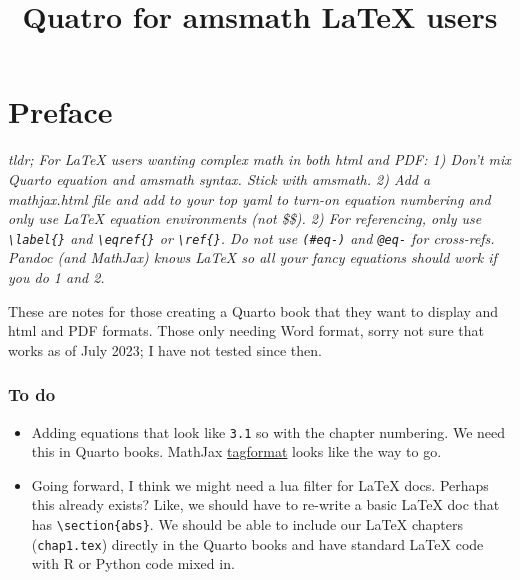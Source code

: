 \documentclass[
  letterpaper,
  DIV=11,
  numbers=noendperiod]{scrreprt}
\title{Quatro for amsmath LaTeX users}
\author{}
\date{}
\providecommand{\tightlist}{%
  \setlength{\itemsep}{0pt}\setlength{\parskip}{0pt}}\usepackage{longtable,booktabs,array}
\renewcommand*\contentsname{Table of contents}
\newcommand\contentsname{Table of contents}
\begin{document}
\maketitle

\renewcommand*\contentsname{Table of contents}
{
\hypersetup{linkcolor=}
\setcounter{tocdepth}{2}
\tableofcontents
}


\chapter*{Preface}\label{preface}


\emph{tldr; For LaTeX users wanting complex math in both html and PDF:
1) Don't mix Quarto equation and amsmath syntax. Stick with amsmath. 2)
Add a mathjax.html file and add to your top yaml to turn-on equation
numbering and only use LaTeX equation environments (not \$\$). 2) For
referencing, only use \texttt{\textbackslash{}label\{\}} and
\texttt{\textbackslash{}eqref\{\}} or \texttt{\textbackslash{}ref\{\}}.
Do not use \texttt{(\#eq-)} and \texttt{@eq-} for cross-refs. Pandoc
(and MathJax) knows LaTeX so all your fancy equations should work if you
do 1 and 2.}

These are notes for those creating a Quarto book that they want to
display and html and PDF formats. Those only needing Word format, sorry
not sure that works as of July 2023; I have not tested since then.

\subsection*{To do}\label{to-do}

\begin{itemize}
\tightlist
\item
  Adding equations that look like \texttt{3.1} so with the chapter
  numbering. We need this in Quarto books. MathJax
  \href{https://docs.mathjax.org/en/latest/input/tex/extensions/tagformat.html\#tex-tagformat}{tagformat}
  looks like the way to go.
\item
  Going forward, I think we might need a lua filter for LaTeX docs.
  Perhaps this already exists? Like, we should have to re-write a basic
  LaTeX doc that has \texttt{\textbackslash{}section\{abs\}}. We should
  be able to include our LaTeX chapters (\texttt{chap1.tex}) directly in
  the Quarto books and have standard LaTeX code with R or Python code
  mixed in.
\end{itemize}
\end{document}
